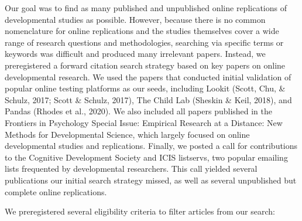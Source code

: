 \documentclass[
  man,floatsintext]{apa6}
\begin{document}
Our goal was to find as many published and unpublished online replications of developmental studies as possible. However, because there is no common nomenclature for online replications and the studies themselves cover a wide range of research questions and methodologies, searching via specific terms or keywords was difficult and produced many irrelevant papers. Instead, we preregistered a forward citation search strategy based on key papers on online developmental research. We used the papers that conducted initial validation of popular online testing platforms as our seeds, including Lookit (Scott, Chu, \& Schulz, 2017; Scott \& Schulz, 2017), The Child Lab (Sheskin \& Keil, 2018), and Pandas (Rhodes et al., 2020). We also included all papers published in the Frontiers in Psychology Special Issue: Empirical Research at a Distance: New Methods for Developmental Science, which largely focused on online developmental studies and replications. Finally, we posted a call for contributions to the Cognitive Development Society and ICIS listservs, two popular emailing lists frequented by developmental researchers. This call yielded several publications our initial search strategy missed, as well as several unpublished but complete online replications.

We preregistered several eligibility criteria to filter articles from our search:
\end{document}
